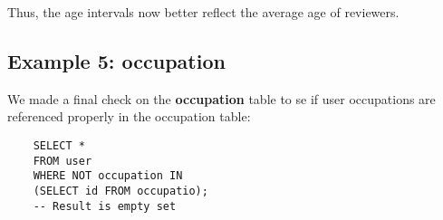 \noindent Thus, the age intervals now better reflect the average age of reviewers. 

\subsection{Example 5: occupation}

We made a final check on the \textbf{occupation} table to se if user occupations are referenced properly in the occupation table: 

\begin{verbatim}
	SELECT * 
	FROM user
	WHERE NOT occupation IN
	(SELECT id FROM occupatio);
	-- Result is empty set 
\end{verbatim}

\begin{comment}

\end{comment}
